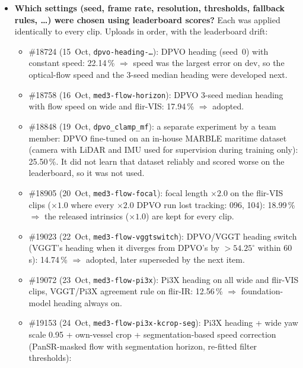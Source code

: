 \documentclass[11pt]{article}
\begin{document}
\begin{itemize}
    (11.41 $\rightarrow$ 11.54\,\%) and better on train (12.35 $\rightarrow$ 12.16\,\%), and was included in the
    uploads because Pi3X's heading agreed better with VGGT's on the cropped test clips (ground-truth-free); it was
    kept because of the leaderboard results of \#19153 and \#19213 (below).
  \item \textbf{Which settings (seed, frame rate, resolution, thresholds, fallback rules, \dots) were chosen
    using leaderboard scores?} Each was applied identically to every clip. Uploads in order, with the leaderboard
    drift:
    \begin{itemize}[nosep]
      \item \#18724 (15~Oct, \texttt{dpvo-heading-\dots}): DPVO heading (seed~0) with constant speed: 22.14\,\%
        $\Rightarrow$ speed was the largest error on dev, so the optical-flow speed and the 3-seed median heading were
        developed next.
      \item \#18758 (16~Oct, \texttt{med3-flow-horizon}): DPVO 3-seed median heading with flow speed on wide and
        flir-VIS: 17.94\,\% $\Rightarrow$ adopted.
      \item \#18848 (19~Oct, \texttt{dpvo\_clamp\_mf}): a separate experiment by a team member: DPVO fine-tuned on an
        in-house MARBLE maritime dataset (camera with LiDAR and IMU used for supervision during training only):
        25.50\,\%. It did not learn that dataset reliably and scored worse on the leaderboard, so it was not used.
      \item \#18905 (20~Oct, \texttt{med3-flow-focal}): focal length $\times2.0$ on the flir-VIS clips ($\times1.0$
        where every $\times2.0$ DPVO run lost tracking: 096, 104): 18.99\,\% $\Rightarrow$ the released intrinsics
        ($\times1.0$) are kept for every clip.
      \item \#19023 (22~Oct, \texttt{med3-flow-vggtswitch}): DPVO/VGGT heading switch (VGGT's heading when it diverges
        from DPVO's by $>54.25^\circ$ within 60\,s): 14.74\,\% $\Rightarrow$ adopted, later superseded by the next item.
      \item \#19072 (23~Oct, \texttt{med3-flow-pi3x}): Pi3X heading on all wide and flir-VIS clips, VGGT/Pi3X agreement
        rule on flir-IR: 12.56\,\% $\Rightarrow$ foundation-model heading always on.
      \item \#19153 (24~Oct, \texttt{med3-flow-pi3x-kcrop-seg}): Pi3X heading + wide yaw scale 0.95 + own-vessel crop +
        segmentation-based speed correction (PanSR-masked flow with segmentation horizon, re-fitted filter thresholds):

\end{itemize}
\end{itemize}
\end{document}
